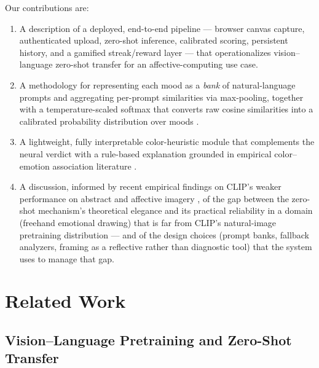 \documentclass[10pt,twocolumn,letterpaper]{article}
\begin{document}
Our contributions are:
\begin{enumerate}
    \item A description of a deployed, end-to-end pipeline --- browser canvas capture, authenticated upload, zero-shot inference, calibrated scoring, persistent history, and a gamified streak/reward layer --- that operationalizes vision--language zero-shot transfer for an affective-computing use case.
    \item A methodology for representing each mood as a \emph{bank} of natural-language prompts and aggregating per-prompt similarities via max-pooling, together with a temperature-scaled softmax that converts raw cosine similarities into a calibrated probability distribution over moods \cite{guo2017calibration}.
    \item A lightweight, fully interpretable color-heuristic module that complements the neural verdict with a rule-based explanation grounded in empirical color--emotion association literature \cite{wilms2018color,colornature2024}.
    \item A discussion, informed by recent empirical findings on CLIP's weaker performance on abstract and affective imagery \cite{conde2024affectiveart}, of the gap between the zero-shot mechanism's theoretical elegance and its practical reliability in a domain (freehand emotional drawing) that is far from CLIP's natural-image pretraining distribution --- and of the design choices (prompt banks, fallback analyzers, framing as a reflective rather than diagnostic tool) that the system uses to manage that gap.
\end{enumerate}

\section{Related Work}

\subsection{Vision--Language Pretraining and Zero-Shot Transfer}
\label{sec:related-clip}
\end{document}
